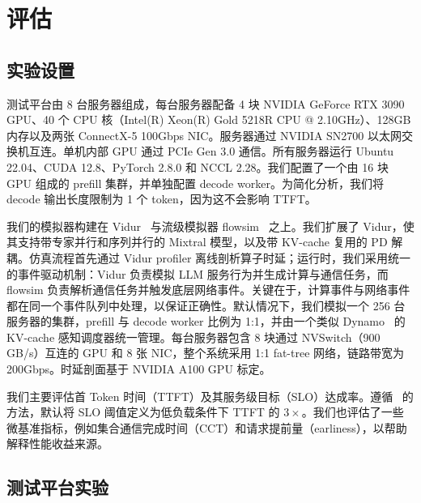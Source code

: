 \section{评估}
\label{sec:evaluation}

\subsection{实验设置}

测试平台由 8 台服务器组成，每台服务器配备 4 块 NVIDIA GeForce RTX 3090 GPU、40 个 CPU 核（Intel(R) Xeon(R) Gold 5218R CPU @ 2.10GHz）、128GB 内存以及两张 ConnectX-5 100Gbps NIC。服务器通过 NVIDIA SN2700 以太网交换机互连。单机内部 GPU 通过 PCIe Gen 3.0 通信。所有服务器运行 Ubuntu 22.04、CUDA 12.8、PyTorch 2.8.0 和 NCCL 2.28。我们配置了一个由 16 块 GPU 组成的 prefill 集群，并单独配置 decode worker。为简化分析，我们将 decode 输出长度限制为 1 个 token，因为这不会影响 TTFT。

我们的模拟器构建在 Vidur~\cite{agrawal2024vidur} 与流级模拟器 flowsim~\cite{FlowSim2024} 之上。我们扩展了 Vidur，使其支持带专家并行和序列并行的 Mixtral 模型，以及带 KV-cache 复用的 PD 解耦。仿真流程首先通过 Vidur profiler 离线剖析算子时延；运行时，我们采用统一的事件驱动机制：Vidur 负责模拟 LLM 服务行为并生成计算与通信任务，而 flowsim 负责解析通信任务并触发底层网络事件。关键在于，计算事件与网络事件都在同一个事件队列中处理，以保证正确性。默认情况下，我们模拟一个 256 台服务器的集群，prefill 与 decode worker 比例为 1:1，并由一个类似 Dynamo~\cite{NVIDIA_Dynamo} 的 KV-cache 感知调度器统一管理。每台服务器包含 8 块通过 NVSwitch（900 GB/s）互连的 GPU 和 8 张 NIC，整个系统采用 1:1 fat-tree 网络，链路带宽为 200Gbps。时延剖面基于 NVIDIA A100 GPU 标定。

我们主要评估首 Token 时间（TTFT）及其服务级目标（SLO）达成率。遵循~\cite{patke2024queue,hongsola,stojkovic2025dynamollm} 的方法，默认将 SLO 阈值定义为低负载条件下 TTFT 的 $3\times$。我们也评估了一些微基准指标，例如集合通信完成时间（CCT）和请求提前量（earliness），以帮助解释性能收益来源。

\subsection{测试平台实验}
\label{sec:evaluation:testbed}






